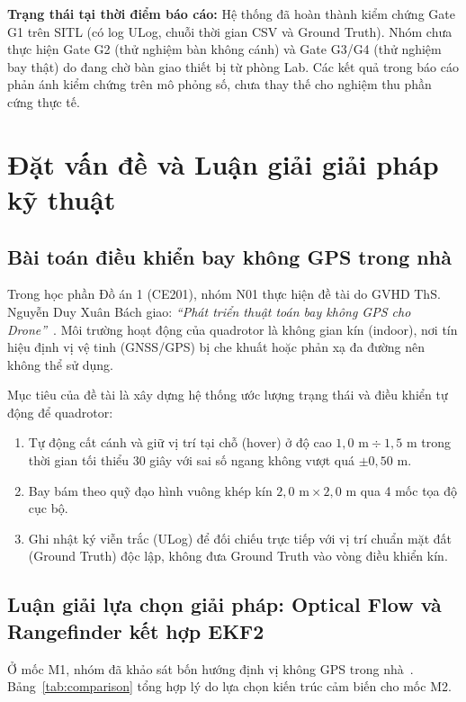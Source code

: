 \documentclass[a4paper,12pt]{article}
\begin{document}
\textbf{Trạng thái tại thời điểm báo cáo:} Hệ thống đã hoàn thành kiểm chứng Gate G1 trên SITL (có log ULog, chuỗi thời gian CSV và Ground Truth). Nhóm chưa thực hiện Gate G2 (thử nghiệm bàn không cánh) và Gate G3/G4 (thử nghiệm bay thật) do đang chờ bàn giao thiết bị từ phòng Lab. Các kết quả trong báo cáo phản ánh kiểm chứng trên mô phỏng số, chưa thay thế cho nghiệm thu phần cứng thực tế.

\section{Đặt vấn đề và Luận giải giải pháp kỹ thuật}

\subsection{Bài toán điều khiển bay không GPS trong nhà}
Trong học phần Đồ án 1 (CE201), nhóm N01 thực hiện đề tài do GVHD ThS. Nguyễn Duy Xuân Bách giao: \textit{“Phát triển thuật toán bay không GPS cho Drone”}~\cite{source1}. Môi trường hoạt động của quadrotor là không gian kín (indoor), nơi tín hiệu định vị vệ tinh (GNSS/GPS) bị che khuất hoặc phản xạ đa đường nên không thể sử dụng.

Mục tiêu của đề tài là xây dựng hệ thống ước lượng trạng thái và điều khiển tự động để quadrotor:
\begin{enumerate}
  \item Tự động cất cánh và giữ vị trí tại chỗ (hover) ở độ cao $1{,}0\text{ m} \div 1{,}5\text{ m}$ trong thời gian tối thiểu 30 giây với sai số ngang không vượt quá $\pm 0{,}50\text{ m}$.
  \item Bay bám theo quỹ đạo hình vuông khép kín $2{,}0\text{ m} \times 2{,}0\text{ m}$ qua 4 mốc tọa độ cục bộ.
  \item Ghi nhật ký viễn trắc (ULog) để đối chiếu trực tiếp với vị trí chuẩn mặt đất (Ground Truth) độc lập, không đưa Ground Truth vào vòng điều khiển kín.
\end{enumerate}

\subsection{Luận giải lựa chọn giải pháp: Optical Flow và Rangefinder kết hợp EKF2}
Ở mốc M1, nhóm đã khảo sát bốn hướng định vị không GPS trong nhà~\cite{source2,source3,source4,source5}. Bảng~\ref{tab:comparison} tổng hợp lý do lựa chọn kiến trúc cảm biến cho mốc M2.
\end{document}
